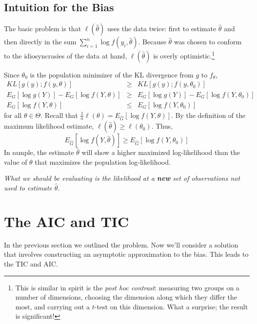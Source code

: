 \documentclass[12pt]{article}
\theoremstyle{definition}
\begin{document}
\subsection{Intuition for the Bias}
The basic problem is that $\ell(\hat{\theta})$ uses the data twice: first to estimate $\hat{\theta}$ and then directly in the sum $\sum_{i=1}^n \log{ f(y_i,\hat{\theta})}$. Because $\hat{\theta}$ was chosen to conform to the idiosyncrasies of the data at hand, $\ell(\hat{\theta})$ is overly optimistic.\footnote{This is similar in spirit is the \emph{post hoc contrast}: measuring two groups on a number of dimensions, choosing the dimension along which they differ the most, and carrying out a $t$-test on this dimension. What a surprise; the result is significant!}

Since $\theta_0$ is the population minimizer of the KL divergence from $g$ to $f_\theta$, 
	\begin{eqnarray*}
		KL\left[ g(y);f(y,\theta) \right] &\geq& KL\left[ g(y);f(y,\theta_0) \right]\\
		E_G\left[  \log{g(Y)}\right] - E_G\left[ \log{f(Y,\theta)} \right] &\geq& E_G\left[  \log{g(Y)}\right] - E_G\left[ \log{f(Y,\theta_0)} \right]\\
	  E_G\left[ \log{f(Y,\theta)} \right] &\leq&  E_G\left[ \log{f(Y,\theta_0)} \right]\
	\end{eqnarray*}
for all $\theta \in \Theta$. Recall that $\frac{1}{n}\ell(\theta) = E_{\hat{G}}\left[ \log{f(Y,\theta)}\right]$. By the definition of the maximum likelihood estimate, $\ell(\hat{\theta})\geq\ell(\theta_0)$. Thus,
		 $$E_{\hat{G}}\left[ \log{f(Y,\hat{\theta})}\right]\geq  E_{\hat{G}}\left[ \log{f\left(Y,\theta_0\right)}\right] $$
In sample, the estimate $\hat{\theta}$ will show a higher maximized log-likelihood than the value of $\theta$ that maximizes the population log-likelihood.

\emph{What we should be evaluating is the likelihood at a \textbf{new} set of observations not used to estimate $\hat{\theta}$.}



\section{The AIC and TIC}
In the previous section we outlined the problem. Now we'll consider a solution that involves constructing an asymptotic approximation to the bias. This leads to the TIC and AIC.
\end{document}

